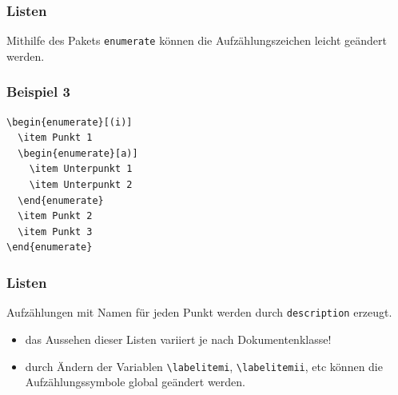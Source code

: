 \begin{frame}[fragile]
\frametitle{Listen}
Mithilfe des Pakets \texttt{enumerate} können die Aufzählungszeichen leicht geändert werden.
\end{frame}
\begin{frame}[fragile,t]
\frametitle{Beispiel 3}\vspace{-10pt}
\begin{lstlisting}[style=Latex]
\begin{enumerate}[(i)]
  \item Punkt 1
  \begin{enumerate}[a)]
    \item Unterpunkt 1
    \item Unterpunkt 2
  \end{enumerate}
  \item Punkt 2
  \item Punkt 3
\end{enumerate}
\end{lstlisting} 
\pause\vspace{-25pt}
\end{frame}
\begin{frame}[fragile]
\frametitle{Listen}
 Aufzählungen mit Namen für jeden Punkt werden durch \texttt{description} erzeugt.
\begin{itemize}[<+->]
  \item das Aussehen dieser Listen variiert je nach Dokumentenklasse!
  \item durch Ändern der Variablen \lstinline[style=Latex]+\labelitemi+, \lstinline[style=Latex]+\labelitemii+, etc können die Aufzählungssymbole global geändert werden.
\end{itemize}
\end{frame}
